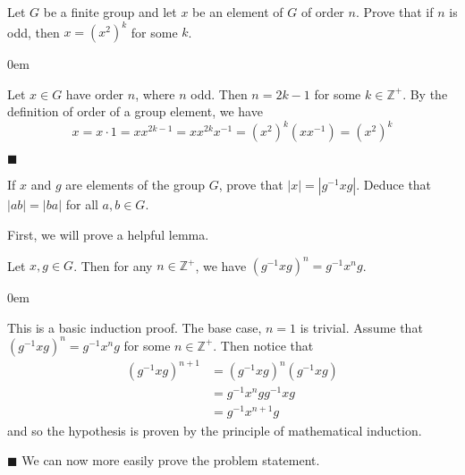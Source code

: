 \documentclass[12pt]{article}
\renewcommand{\qed}{\hfill$\blacksquare$}
\renewenvironment{proof}{\begin{addmargin}[1em]{0em}\begin{newproof}}{\end{newproof}\end{addmargin}\qed}
\newenvironment{lemma}[2][Lemma]{\begin{trivlist}
\item[\hskip \labelsep {\bfseries #1}\hskip \labelsep {\bfseries #2.}]}{\end{trivlist}}
\newenvironment{problem}[2][Exercise]{\begin{trivlist}
\item[\hskip \labelsep {\bfseries #1}\hskip \labelsep {\bfseries #2.}]}{\end{trivlist}}
\begin{document}
\begin{problem}{1.1.21}
Let $G$ be a finite group and let $x$ be an element of $G$ of order $n$. Prove that if $n$ is odd, then $x=\left(x^2\right)^k$ for some $k$.
\end{problem}
\begin{proof}
Let $x\in G$ have order $n$, where $n$ odd. Then $n=2k-1$ for some $k\in \mathbb{Z}^+$. By the definition of order of a group element, we have
$$ x = x\cdot 1 = x x^{2k-1} = x x^{2k}x^{-1} =\left(x^2\right)^k \left(xx^{-1}\right) = \left(x^2\right)^k $$
\end{proof}


\begin{problem}{1.1.22}
If $x$ and $g$ are elements of the group $G$, prove that $\left|x\right| = \left|g^{-1}xg\right|$. Deduce that $\left|ab\right|=\left|ba\right|$ for all $a,b\in G$.
\end{problem}
First, we will prove a helpful lemma.
\begin{lemma}{1.2.22}
Let $x,g \in G$. Then for any $n\in \mathbb{Z}^+$, we have $\left(g^{-1}xg\right)^n = g^{-1}x^ng$.
\end{lemma}
\begin{proof}
This is a basic induction proof. The base case, $n=1$ is trivial. Assume that $\left(g^{-1}xg\right)^n = g^{-1}x^ng$ for some $n\in \mathbb{Z}^+$. Then notice that
\begin{equation*}
    \begin{split}
        \left(g^{-1}xg\right)^{n+1} & = \left(g^{-1}xg\right)^n \left(g^{-1}xg\right) \\
        & = g^{-1}x^n g g^{-1}xg \\
        & = g^{-1}x^{n+1}g
    \end{split}
\end{equation*}
and so the hypothesis is proven by the principle of mathematical induction.
\end{proof}
We can now more easily prove the problem statement.
\end{document}
